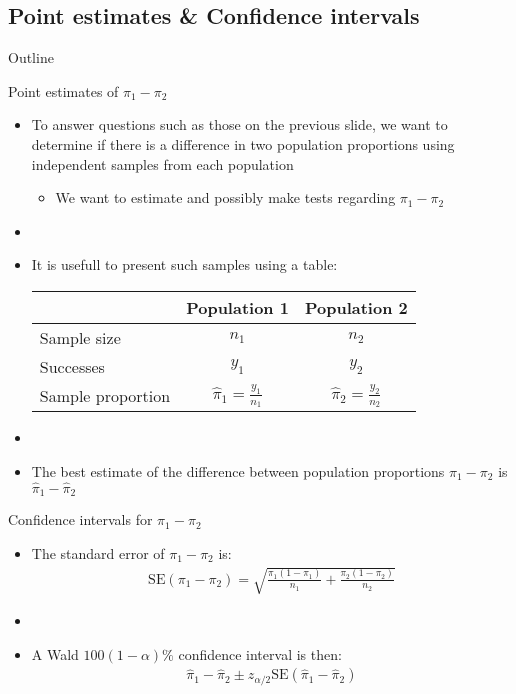 \documentclass[xcolor=dvipsnames]{beamer}
\begin{document}
\subsection{Point estimates \& Confidence intervals}
\begin{frame}{Outline}
	\tableofcontents[currentsection,subsectionstyle=show/shaded/hide]
\end{frame}

\begin{frame}{Point estimates of $\pi_1 - \pi_2$}
	\begin{itemize}
		\item To answer questions such as those on the previous slide, we want to determine if there is a difference in two population proportions using independent samples from each population
		\begin{itemize}
			\item We want to estimate and possibly make tests regarding $\pi_1 - \pi_2$
		\end{itemize}
		\item[]
		\item It is usefull to present such samples using a table:
		\begin{center}
			\begin{tabular}{lcc}
				\hline
				& Population 1 & Population 2 \\ \hline
				Sample size & $n_1$ & $n_2$ \\
				Successes & $y_1$ & $y_2$ \\
				Sample proportion & $\hat{\pi}_1 = \frac{y_1}{n_1}$ & $\hat{\pi}_2 = \frac{y_2}{n_2}$ \\ \hline
			\end{tabular}
		\end{center}
	\item[]
	\item The best estimate of the difference between population proportions $\pi_1 - \pi_2$ is $\hat{\pi}_1 - \hat{\pi}_2$
	\end{itemize}
\end{frame}

\begin{frame}{Confidence intervals for $\pi_1 - \pi_2$}
	\begin{itemize}
		\item The standard error of $\pi_1 - \pi_2$ is:
		\begin{gather*}
		\text{SE}(\pi_1 - \pi_2) = \sqrt{\frac{\pi_1 (1-\pi_1)}{n_1}+\frac{\pi_2 (1-\pi_2)}{n_2}}
		\end{gather*}
		\item[]
		\item A Wald $100(1-\alpha)\%$ confidence interval is then:
		\begin{gather*}
		\hat{\pi}_1 - \hat{\pi}_2 \pm z_{\alpha/2}\text{SE}(\hat{\pi}_1-\hat{\pi}_2)
		\end{gather*}
	\end{itemize}
\end{frame}
\end{document}
